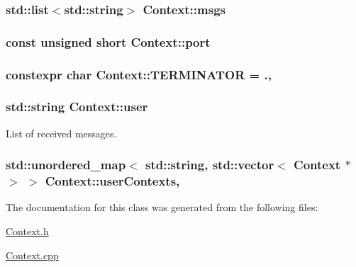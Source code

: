 \subsubsection[{\texorpdfstring{msgs}{msgs}}]{\setlength{\rightskip}{0pt plus 5cm}std\+::list$<$std\+::string$>$ Context\+::msgs\hspace{0.3cm}{\ttfamily [private]}}\hypertarget{classContext_a24115a22c1e187f610f41d9542b3516a}{}\label{classContext_a24115a22c1e187f610f41d9542b3516a}
\subsubsection[{\texorpdfstring{port}{port}}]{\setlength{\rightskip}{0pt plus 5cm}const unsigned short Context\+::port}\hypertarget{classContext_a68ab96bf75c30c3497312f95ace6de91}{}\label{classContext_a68ab96bf75c30c3497312f95ace6de91}
\subsubsection[{\texorpdfstring{T\+E\+R\+M\+I\+N\+A\+T\+OR}{TERMINATOR}}]{\setlength{\rightskip}{0pt plus 5cm}constexpr char Context\+::\+T\+E\+R\+M\+I\+N\+A\+T\+OR = \textquotesingle{}.\textquotesingle{}\hspace{0.3cm}{\ttfamily [static]}, {\ttfamily [private]}}\hypertarget{classContext_a5a12ec226a7135dc356ab34745a3f5df}{}\label{classContext_a5a12ec226a7135dc356ab34745a3f5df}
\subsubsection[{\texorpdfstring{user}{user}}]{\setlength{\rightskip}{0pt plus 5cm}std\+::string Context\+::user\hspace{0.3cm}{\ttfamily [private]}}\hypertarget{classContext_a8525c6ece0d6a53339ef8a59c1cfd668}{}\label{classContext_a8525c6ece0d6a53339ef8a59c1cfd668}


List of received messages. 

\subsubsection[{\texorpdfstring{user\+Contexts}{userContexts}}]{\setlength{\rightskip}{0pt plus 5cm}std\+::unordered\+\_\+map$<$ std\+::string, std\+::vector$<$ {\bf Context} $\ast$ $>$ $>$ Context\+::user\+Contexts\hspace{0.3cm}{\ttfamily [static]}, {\ttfamily [private]}}\hypertarget{classContext_a73f2f8250661a88e254e49a266f6a705}{}\label{classContext_a73f2f8250661a88e254e49a266f6a705}


The documentation for this class was generated from the following files\+:\begin{DoxyCompactItemize}
\item 
\hyperlink{Context_8h}{Context.\+h}\item 
\hyperlink{Context_8cpp}{Context.\+cpp}\end{DoxyCompactItemize}
